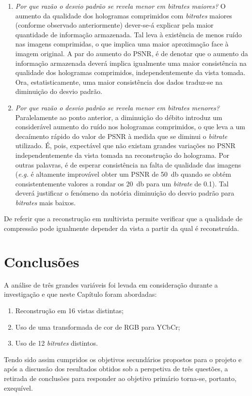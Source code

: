 \begin{enumerate}
    \item \textit{Por que razão o desvio padrão se revela menor em \emph{bitrates} maiores?}\newline
    O aumento da qualidade dos hologramas comprimidos com \textit{bitrates} maiores (conforme observado anteriormente) dever-se-á explicar pela maior quantidade de informação armazenada. Tal leva à existência de menos ruído nas imagens comprimidas, o que implica uma maior aproximação face à imagem original.\newline
    A par do aumento do \ac{PSNR}, é de denotar que o aumento da informação armazenada deverá implica igualmente uma maior consistência na qualidade dos hologramas comprimidos, independentemente da vista tomada.\newline
    Ora, estatisticamente, uma maior consistência dos dados traduz-se na diminuição do desvio padrão.

    \item \textit{Por que razão o desvio padrão se revela menor em \emph{bitrates} menores?}\newline
    Paralelamente ao ponto anterior, a diminuição do débito introduz um considerável aumento do ruído nos hologramas comprimidos, o que leva a um decaímento rápido do valor de \ac{PSNR} à medida que se diminui o \textit{bitrate} utilizado.\newline
    É, pois, expectável que não existam grandes variações no \ac{PSNR} independentemente da vista tomada na reconstrução do holograma. Por outras palavras, é de esperar consistência na falta de qualidade das imagens (\textit{e.g.} é altamente improvável obter um \ac{PSNR} de \SI{50}{\decibel} quando se obtém consistentemente valores a rondar os \SI{20}{\decibel} para um \textit{bitrate} de \SI{0.1}{}).\newline
    Tal deverá justificar o fenómeno da notória diminuição do desvio padrão para \textit{bitrates} mais baixos.
\end{enumerate}

De referir que a reconstrução em multivista permite verificar que a qualidade de compressão pode igualmente depender da vista a partir da qual é reconstruída.

\section{Conclusões}
\label{sec::test-result:conclusao}

A análise de três grandes variáveis foi levada em consideração durante a investigação e que neste Capítulo foram abordadas:
\begin{enumerate}
    \item Reconstrução em 16 vistas distintas;
    \item Uso de uma transformada de cor de \ac{RGB} para YCbCr;
    \item Uso de 12 \textit{bitrates} distintos.
\end{enumerate}

Tendo sido assim cumpridos os objetivos secundários propostos para o projeto e após a discussão dos resultados obtidos sob a perspetiva de três questões, a retirada de conclusões para responder ao objetivo primário torna-se, portanto, exequível.
